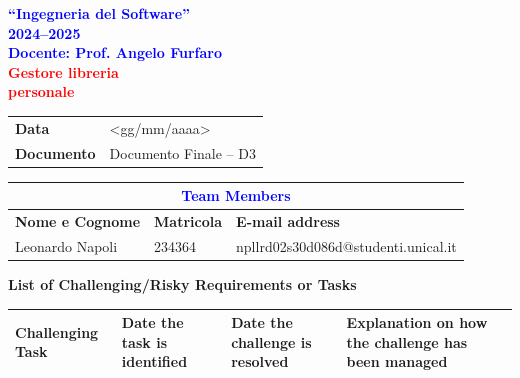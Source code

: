 


\begin{titlepage}
  \begin{center}
    \thispagestyle{title}
    \vspace*{1.5cm}

    \begin{center}
      {\LARGE \textbf{\textcolor{blue}{``Ingegneria del Software''}}}\\[0.3cm]
      {\LARGE \textbf{\textcolor{blue}{2024--2025}}}\\[1cm]
      {\normalsize \textbf{\textcolor{blue}{Docente: Prof. Angelo Furfaro}}}\\[1.2cm]
      {\Huge \textbf{\textcolor{red}{Gestore libreria}}}\\[0.3cm]
      {\Huge \textbf{\textcolor{red}{personale}}}
    \end{center}

    \vspace*{2.5cm}

    \noindent
    \begin{tabular}{|>{\bfseries}p{3cm}|p{12cm}|}
      \hline
      Data & <gg/mm/aaaa> \\
      Documento & Documento Finale -- D3 \\
      \hline
    \end{tabular}

    \vspace*{2.5cm}

    \begin{tabular}{|l|l|l|}
      \hline
      \multicolumn{3}{|c|}{\large \textbf{\textcolor{blue}{Team Members}}} \\
      \hline
      \textbf{Nome e Cognome} & \textbf{Matricola} & \textbf{E-mail address} \\
      \hline
      Leonardo Napoli & 234364 & npllrd02s30d086d@studenti.unical.it \\
      \hline
    \end{tabular}
  \end{center}
\end{titlepage}

\tableofcontents
\newpage
\pagestyle{plain}
{\Large \textbf{List of Challenging/Risky Requirements or Tasks}\label{list-of-challengingrisky-requirements-or-tasks}}

\begin{center}
  \begin{tabularx}{\textwidth}{|X|X|X|X|}
    \hline
    \textbf{Challenging Task}&
    \textbf{Date the task is identified}&
    \textbf{Date the challenge is resolved}&
    \textbf{Explanation on how the challenge has been managed}\\
    \hline
  \end{tabularx}
\end{center}

